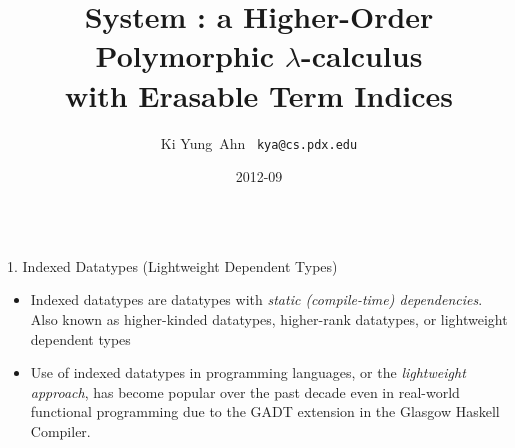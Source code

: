 \documentclass[final]{beamer}
\title[System \Fi]{{\VERYHuge System \Fi} {\Huge :}
		{\huge a Higher-Order Polymorphic $\lambda$-calculus} \\
		{\huge with Erasable Term Indices}
  }
\author[Ki Yung Ahn]{ Ki Yung $\,$Ahn $\,$ {\Large\texttt{kya@cs.pdx.edu}} }
\institute[Portland State University]{
	Department of Computer Science, Portland State University }
\date{2012-09}
\begin{document}
\begin{frame}[fragile]
\begin{columns}[t]

\begin{column}{.315\linewidth}

\begin{block}{1. Indexed Datatypes
	{\normalsize(Lightweight Dependent Types)} }
\begin{itemize}
\item Indexed datatypes are datatypes
	with \emph{static (compile-time) dependencies}.
	Also known as higher-kinded datatypes, higher-rank datatypes,
	or lightweight dependent types
\item Use of indexed datatypes in programming languages,
	or the {\emph{lightweight approach}}, has become popular
	over the past decade even in real-world functional programming due to
	the GADT extension in the Glasgow Haskell Compiler.
\end{itemize}
\end{block}


\end{column}
\end{columns}
\end{frame}
\end{document}
